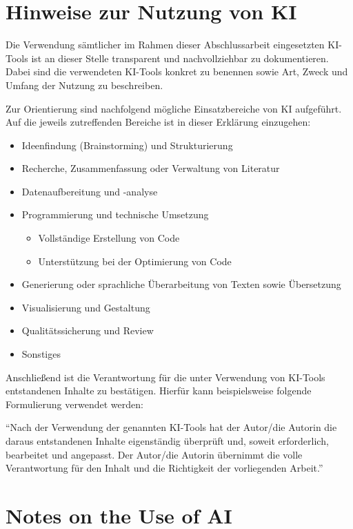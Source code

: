 \newpage
\ifnum{}
  \chapter*{Hinweise zur Nutzung von KI}

  Die Verwendung sämtlicher im Rahmen dieser Abschlussarbeit eingesetzten KI-Tools ist an dieser Stelle transparent und nachvollziehbar zu dokumentieren. Dabei sind die verwendeten KI-Tools konkret zu benennen sowie Art, Zweck und Umfang der Nutzung zu beschreiben.

  Zur Orientierung sind nachfolgend mögliche Einsatzbereiche von KI aufgeführt. Auf die jeweils zutreffenden Bereiche ist in dieser Erklärung einzugehen:
  \begin{itemize}
    \item Ideenfindung (Brainstorming) und Strukturierung
    \item Recherche, Zusammenfassung oder Verwaltung von Literatur
    \item Datenaufbereitung und -analyse
    \item Programmierung und technische Umsetzung
    \begin{itemize}
      \item Vollständige Erstellung von Code
      \item Unterstützung bei der Optimierung von Code
    \end{itemize}
    \item Generierung oder sprachliche Überarbeitung von Texten sowie Übersetzung
    \item Visualisierung und Gestaltung
    \item Qualitätssicherung und Review
    \item Sonstiges
  \end{itemize}

  Anschließend ist die Verantwortung für die unter Verwendung von KI-Tools entstandenen Inhalte zu bestätigen. Hierfür kann beispielsweise folgende Formulierung verwendet werden:

  \enquote{Nach der Verwendung der genannten KI-Tools hat der Autor/die Autorin die daraus entstandenen Inhalte eigenständig überprüft und, soweit erforderlich, bearbeitet und angepasst. Der Autor/die Autorin übernimmt die volle Verantwortung für den Inhalt und die Richtigkeit der vorliegenden Arbeit.}
\else
  \chapter*{Notes on the Use of AI}

